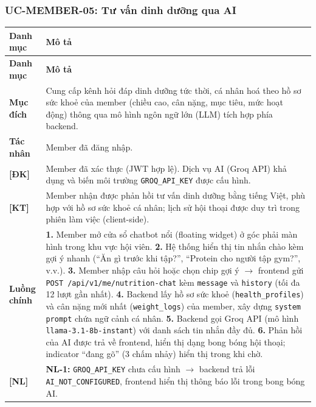 \subsubsection{UC-MEMBER-05: Tư vấn dinh dưỡng qua AI}
\begingroup
\renewcommand{\arraystretch}{1.3}
\begin{longtable}{|>{\centering\arraybackslash}m{3cm}|>{\raggedright\arraybackslash}m{12cm}|}
\hline
\textbf{Danh mục} & \textbf{Mô tả} \\ \hline
\endfirsthead
\hline
\textbf{Danh mục} & \textbf{Mô tả} \\ \hline
\endhead
\hline
\endfoot
\textbf{Mục đích} & Cung cấp kênh hỏi đáp dinh dưỡng tức thời, cá nhân hoá theo hồ sơ sức khoẻ của member (chiều cao, cân nặng, mục tiêu, mức hoạt động) thông qua mô hình ngôn ngữ lớn (LLM) tích hợp phía backend. \\
\hline
\textbf{Tác nhân} & Member đã đăng nhập. \\
\hline
\textbf{[ĐK]} & Member đã xác thực (JWT hợp lệ). Dịch vụ AI (Groq API) khả dụng và biến môi trường \texttt{GROQ\_API\_KEY} được cấu hình. \\
\hline
\textbf{[KT]} & Member nhận được phản hồi tư vấn dinh dưỡng bằng tiếng Việt, phù hợp với hồ sơ sức khoẻ cá nhân; lịch sử hội thoại được duy trì trong phiên làm việc (client-side). \\
\hline
\textbf{Luồng chính} &
\textbf{1.} Member mở cửa sổ chatbot nổi (floating widget) ở góc phải màn hình trong khu vực hội viên. \newline
\textbf{2.} Hệ thống hiển thị tin nhắn chào kèm gợi ý nhanh (``Ăn gì trước khi tập?'', ``Protein cho người tập gym?'', v.v.). \newline
\textbf{3.} Member nhập câu hỏi hoặc chọn chip gợi ý $\rightarrow$ frontend gửi \texttt{POST /api/v1/me/nutrition-chat} kèm \texttt{message} và \texttt{history} (tối đa 12 lượt gần nhất). \newline
\textbf{4.} Backend lấy hồ sơ sức khoẻ (\texttt{health\_profiles}) và cân nặng mới nhất (\texttt{weight\_logs}) của member, xây dựng \texttt{system prompt} chứa ngữ cảnh cá nhân. \newline
\textbf{5.} Backend gọi Groq API (mô hình \texttt{llama-3.1-8b-instant}) với danh sách tin nhắn đầy đủ. \newline
\textbf{6.} Phản hồi của AI được trả về frontend, hiển thị dạng bong bóng hội thoại; indicator ``đang gõ'' (3 chấm nhảy) hiển thị trong khi chờ. \\
\hline
\textbf{[NL]} &
\textbf{NL-1:} \texttt{GROQ\_API\_KEY} chưa cấu hình $\rightarrow$ backend trả lỗi \texttt{AI\_NOT\_CONFIGURED}, frontend hiển thị thông báo lỗi trong bong bóng AI. \newline

\end{longtable}
